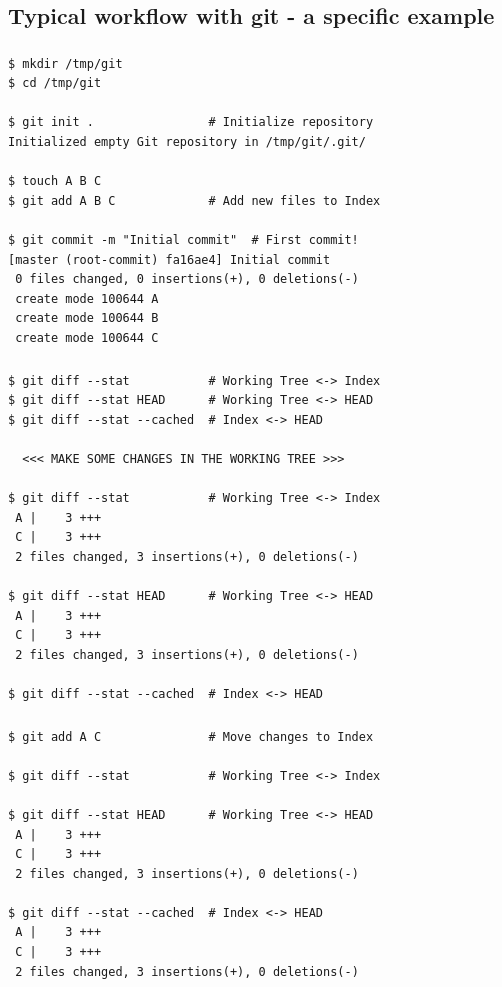 
\subsection{Typical workflow with git - a specific example}
\begin{frame}[fragile]
  \frametitle{\insertsubsection}

  \begin{small}
\begin{verbatim}
$ mkdir /tmp/git
$ cd /tmp/git

$ git init .                # Initialize repository
Initialized empty Git repository in /tmp/git/.git/

$ touch A B C
$ git add A B C             # Add new files to Index

$ git commit -m "Initial commit"  # First commit!
[master (root-commit) fa16ae4] Initial commit
 0 files changed, 0 insertions(+), 0 deletions(-)
 create mode 100644 A
 create mode 100644 B
 create mode 100644 C
\end{verbatim}
  \end{small}

\end{frame}
\begin{frame}[fragile]
  \frametitle{\insertsubsection}

  \begin{small}
\begin{verbatim}
$ git diff --stat           # Working Tree <-> Index
$ git diff --stat HEAD      # Working Tree <-> HEAD
$ git diff --stat --cached  # Index <-> HEAD

  <<< MAKE SOME CHANGES IN THE WORKING TREE >>>

$ git diff --stat           # Working Tree <-> Index
 A |    3 +++
 C |    3 +++
 2 files changed, 3 insertions(+), 0 deletions(-)

$ git diff --stat HEAD      # Working Tree <-> HEAD
 A |    3 +++
 C |    3 +++
 2 files changed, 3 insertions(+), 0 deletions(-)

$ git diff --stat --cached  # Index <-> HEAD
\end{verbatim}
  \end{small}

\end{frame}
\begin{frame}[fragile]
  \frametitle{\insertsubsection}

  \begin{small}
\begin{verbatim}
$ git add A C               # Move changes to Index

$ git diff --stat           # Working Tree <-> Index

$ git diff --stat HEAD      # Working Tree <-> HEAD
 A |    3 +++
 C |    3 +++
 2 files changed, 3 insertions(+), 0 deletions(-)

$ git diff --stat --cached  # Index <-> HEAD
 A |    3 +++
 C |    3 +++
 2 files changed, 3 insertions(+), 0 deletions(-)
\end{verbatim}
  \end{small}

\end{frame}
